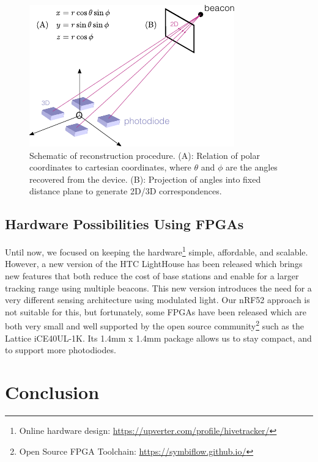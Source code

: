 \documentclass[sigchi]{acmart}
\begin{document}
\begin{figure}[h]
\centering
\includegraphics[width=1.0\columnwidth]{Figures/reconstruction.pdf}
\caption{Schematic of reconstruction procedure. (A): Relation of polar coordinates to cartesian coordinates, where $\theta$ and $\phi$ are the angles recovered from the device. (B): Projection of angles into fixed distance plane to generate 2D/3D correspondences.}
\label{Fig:Reconstruction}
\end{figure}


\subsection{Hardware Possibilities Using FPGAs}

Until now, we focused on keeping the hardware\footnote{Online hardware design: \url{https://upverter.com/profile/hivetracker/}} simple, affordable, and scalable. However, a new version of the HTC LightHouse has been released which brings new features that both reduce the cost of base stations and enable for a larger tracking range using multiple beacons. This new version introduces the need for a very different sensing architecture using modulated light. Our nRF52 approach is not suitable for this, but fortunately, some FPGAs have been released which are both very small and well supported by the open source community\footnote{Open Source FPGA Toolchain: \url{https://symbiflow.github.io/}} such as the Lattice iCE40UL-1K. Its 1.4mm x 1.4mm package allows us to stay compact, and to support more photodiodes.


\section{Conclusion}
\end{document}
